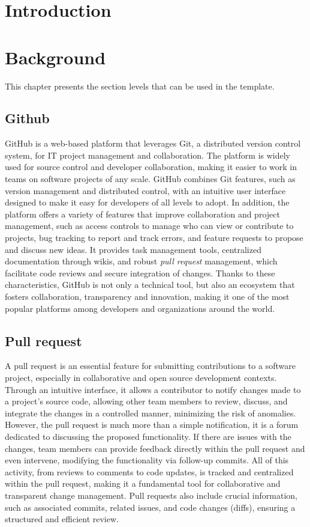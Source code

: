 \chapter{Introduction}
\chapter{Background}
\thispagestyle{plain}


This chapter presents the section levels that can be used in the template. 


\section{Github}
GitHub is a web-based platform that leverages Git, a distributed version control system, for IT project management and collaboration. 
The platform is widely used for source control and developer collaboration, making it easier to work in teams on software projects of any scale.
GitHub combines Git features, such as version management and distributed control, with an intuitive user interface designed to make it easy for developers of all levels to adopt.
In addition, the platform offers a variety of features that improve collaboration and project management, such as access controls to manage who can view or contribute to projects,
bug tracking to report and track errors, and feature requests to propose and discuss new ideas.
It provides task management tools, centralized documentation through wikis, and robust \textit{pull request} management, which facilitate code reviews and secure integration of changes.
Thanks to these characteristics, GitHub is not only a technical tool, but also an ecosystem that fosters collaboration, transparency and innovation, making it one of the most popular platforms among developers and organizations around the world.
\section{Pull request}
A pull request is an essential feature for submitting contributions to a software project, especially in collaborative and open source development contexts.
Through an intuitive interface, it allows a contributor to notify changes made to a project's source code, allowing other team members to review, discuss, and integrate the changes in a controlled manner, minimizing the risk of anomalies.
However, the pull request is much more than a simple notification, it is a forum dedicated to discussing the proposed functionality.
If there are issues with the changes, team members can provide feedback directly within the pull request and even intervene, modifying the functionality via follow-up commits.
All of this activity, from reviews to comments to code updates, is tracked and centralized within the pull request, making it a fundamental tool for collaborative and transparent change management.
Pull requests also include crucial information, such as associated commits, related issues, and code changes (diffs), ensuring a structured and efficient review.
